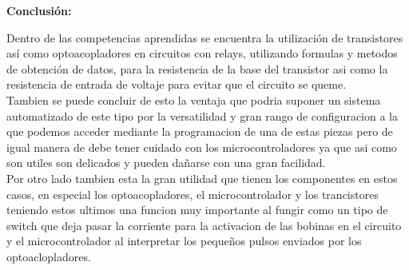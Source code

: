\documentclass[letterpaper]{article}
\begin{document}
 \begin{huge}
    \textbf{Conclusión:}\\
\end{huge}
Dentro de las competencias aprendidas se encuentra la utilización de transistores así como optoacopladores en circuitos con relays, utilizando formulas y metodos de obtención de datos, para la resistencia de la base del transistor asi como la resistencia de entrada de voltaje para evitar que el circuito se queme.\\
Tambien se puede concluir de esto la ventaja que podria suponer un sistema automatizado de este tipo por la versatilidad y gran rango de configuracion a la que podemos acceder mediante la programacion de una de estas piezas pero de igual manera de debe tener cuidado con los microcontroladores ya que asi como son utiles son delicados y pueden dañarse con una gran facilidad.\\
Por otro lado tambien esta la gran utilidad que tienen los componentes en estos casos, en especial los optoacopladores, el microcontrolador y los trancistores teniendo estos ultimos una funcion muy importante al fungir como un tipo de switch que deja pasar la corriente para la activacion de las bobinas en el circuito y el microcontrolador al interpretar los pequeños pulsos enviados por los optoaclopladores.\\
\end{document}

